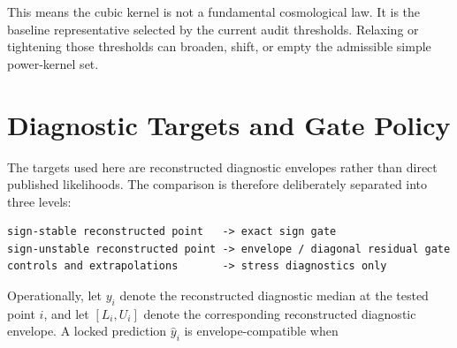 \documentclass[11pt]{article}
\begin{document}
\begin{center}
\begingroup
\scriptsize
\setlength{\tabcolsep}{3pt}
\renewcommand{\arraystretch}{1.15}
\endgroup
\end{center}

This means the cubic kernel is not a fundamental cosmological law. It is the
baseline representative selected by the current audit thresholds. Relaxing or
tightening those thresholds can broaden, shift, or empty the admissible simple
power-kernel set.

\section{Diagnostic Targets and Gate Policy}

The targets used here are reconstructed diagnostic envelopes rather than direct
published likelihoods. The comparison is therefore deliberately separated into
three levels:

\begin{verbatim}
sign-stable reconstructed point   -> exact sign gate
sign-unstable reconstructed point -> envelope / diagonal residual gate
controls and extrapolations       -> stress diagnostics only
\end{verbatim}

Operationally, let $y_i$ denote the reconstructed diagnostic median at the
tested point $i$, and let $[L_i,U_i]$ denote the corresponding reconstructed
diagnostic envelope. A locked prediction $\hat y_i$ is envelope-compatible
when
\end{document}
